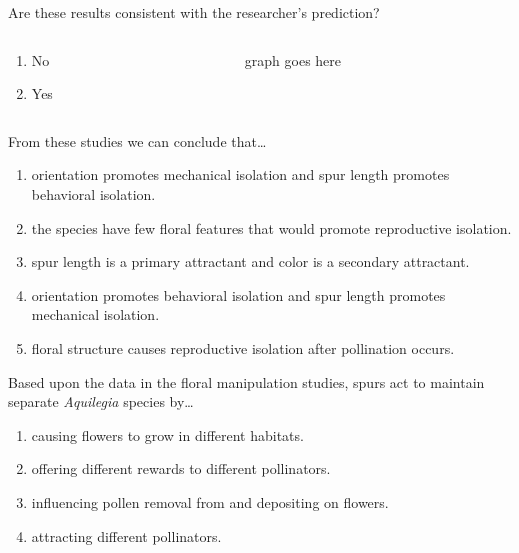 \documentclass[t,hidelinks]{beamer}
\newcommand{\ques}[1]{\highlight{\textsc{q#1:}}}
\begin{document}
%
\begin{frame}[t]{\ques{13} Are these results consistent with the researcher's prediction?}
		\begin{columns}[t]
		\begin{column}{0.28\textwidth}
			\begin{enumerate}
				\item No
				\item Yes
			\end{enumerate}
		\end{column}
		\begin{column}{0.5\textwidth}
			graph goes here			
		\end{column}
	\end{columns}
	
\end{frame}
%
\begin{frame}[t]{\ques{14} From these studies we can conclude that\dots}
	
	\begin{enumerate}
		\item orientation promotes mechanical isolation and spur length promotes behavioral isolation.
		\item the species have few floral features that would promote reproductive isolation.
		\item spur length is a primary attractant and color is a secondary attractant.
		\item orientation promotes behavioral isolation and spur length promotes mechanical isolation.
		\item floral structure causes reproductive isolation after pollination occurs.
	\end{enumerate}
\end{frame}
%
\begin{frame}[t]{\ques{15} Based upon the data in the floral manipulation studies, spurs act to maintain separate \textit{Aquilegia} species by\dots}
	
	\begin{enumerate}
		\item causing flowers to grow in different habitats.
		\item offering different rewards to different pollinators.
		\item influencing pollen removal from and depositing on flowers. 
		\item attracting different pollinators.
	\end{enumerate}
\end{frame}
\end{document}
